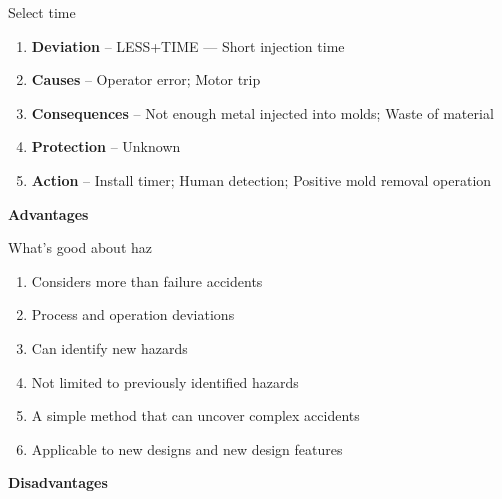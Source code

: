 \documentclass[aspectratio=1610,pdftex,dvipsnames,compress,xcolor={dvipsnames}]{beamer}
\newcommand{\acs}{\acrshort} %
\begin{document}
\begin{frame}{Select time}
    \begin{enumerate}[series=outerlist,topsep=0pt,itemsep=21pt,leftmargin=*,label=(\arabic*)]
        \item[]\textbf{Deviation} -- LESS+TIME --- Short injection time
        \item[]\textbf{Causes} -- Operator error; Motor trip
        \item[]\textbf{Consequences} -- Not enough metal injected into molds; Waste of material
        \item[]\textbf{Protection} -- Unknown
        \item[]\textbf{Action} -- Install timer; Human detection; Positive mold removal operation
    \end{enumerate}
\end{frame}


\begin{frame}[plain]{}
    \centering\LARGE\textbf{Advantages}
\end{frame}


\addtocounter{framenumber}{-1}
\begin{frame}{What's good about \acs{haz}}
    \begin{enumerate}[series=outerlist,topsep=0pt,itemsep=15pt,leftmargin=*,label=(\arabic*)]
        \item[]Considers more than failure accidents  
        \item[]Process and operation deviations
        \item[]Can identify new hazards  
        \item[]Not limited to previously identified hazards
        \item[]A simple method that can uncover complex accidents  
        \item[]Applicable to new designs and new design features
    \end{enumerate}
\end{frame}


\begin{frame}[plain]{}
    \centering\LARGE\textbf{Disadvantages}
\end{frame}
\end{document}
